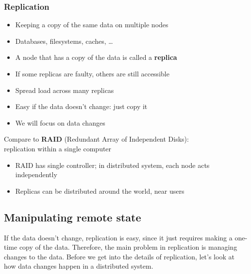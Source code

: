 \begin{frame}
    \label{s:replication-intro}
    \frametitle{Replication}
    \begin{itemize}
        \item Keeping a copy of the same data on multiple nodes
        \item Databases, filesystems, caches, \dots
        \item A node that has a copy of the data is called a \textbf{replica}\pause
        \item If some replicas are faulty, others are still accessible
        \item Spread load across many replicas\pause
        \item Easy if the data doesn't change: just copy it
        \item We will focus on data changes\\[1em]\pause
    \end{itemize}
    Compare to \textbf{RAID} (Redundant Array of Independent Disks):\\replication within a single computer
    \begin{itemize}
        \item RAID has single controller; in distributed system, each node acts independently
        \item Replicas can be distributed around the world, near users
    \end{itemize}
\end{frame}
\label{l:replication-intro}

\subsection{Manipulating remote state}\label{sec:remote-state}

If the data doesn't change, replication is easy, since it just requires making a one-time copy of the data.
Therefore, the main problem in replication is managing changes to the data.
Before we get into the details of replication, let's look at how data changes happen in a distributed system.

